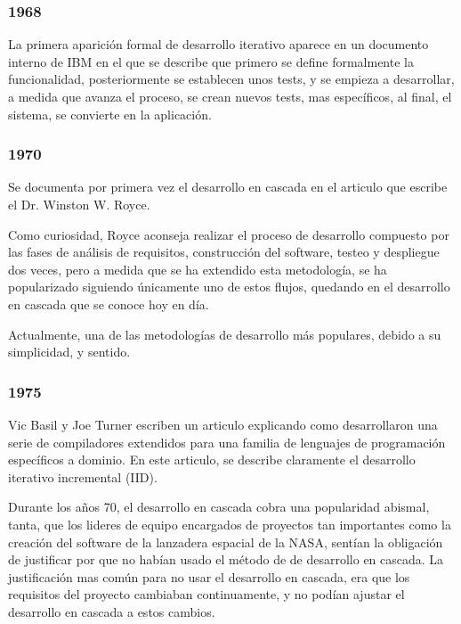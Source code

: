 \documentclass[12pt]{report} %
\begin{document}
\subsubsection{1968}

La primera aparición formal de desarrollo iterativo aparece en un documento interno de IBM en el que se describe que primero se define formalmente la funcionalidad, posteriormente se establecen unos tests, y se empieza a desarrollar, a medida que avanza el proceso, se crean nuevos tests, mas específicos, al final, el sistema, se convierte en la aplicación. \cite{ID-FB}

\subsubsection{1970}

Se documenta por primera vez el desarrollo en cascada en el articulo que escribe el Dr. Winston W. Royce. \par
Como curiosidad, Royce aconseja realizar el proceso de desarrollo compuesto por las fases de análisis de requisitos, construcción del software, testeo y despliegue dos veces, pero a medida que se ha extendido esta metodología, se ha popularizado siguiendo únicamente uno de estos flujos, quedando en el desarrollo en cascada que se conoce hoy en día. \cite{royce1970} \par
Actualmente, una de las metodologías de desarrollo más populares, debido a su simplicidad, y sentido. \par

\subsubsection{1975}

Vic Basil y Joe Turner escriben un articulo explicando como desarrollaron una serie de compiladores extendidos para una familia de lenguajes de programación específicos a dominio.
En este articulo, se describe claramente el desarrollo iterativo incremental (IID). \cite{6312870}

Durante los años 70, el desarrollo en cascada cobra una popularidad abismal, tanta, que los lideres de equipo encargados de proyectos tan importantes como la creación del software de la lanzadera espacial de la NASA, sentían la obligación de justificar por que no habían usado el método de de desarrollo en cascada.
La justificación mas común para no usar el desarrollo en cascada, era que los requisitos del proyecto cambiaban continuamente, y no podían ajustar el desarrollo en cascada a estos cambios.
\end{document}
